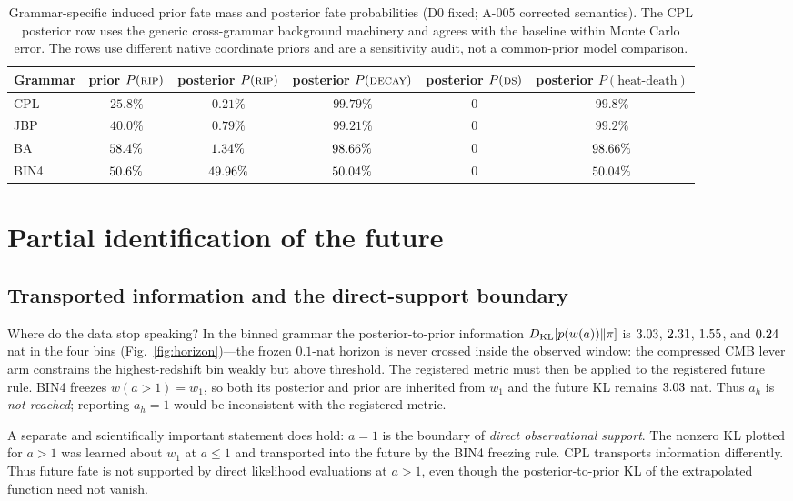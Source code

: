 \documentclass[a4paper,11pt]{article}
\begin{document}
\begin{table}[t]
\caption{Grammar-specific induced prior fate mass and posterior fate
probabilities (D0 fixed; A-005 corrected semantics). The CPL posterior row uses the
generic cross-grammar background machinery and agrees with the baseline
within Monte Carlo error. The rows use different native coordinate priors and
are a sensitivity audit, not a common-prior model comparison.}\label{tab:grammar}
\scriptsize
\begin{tabular}{lccccc}
Grammar & prior $P(\textsc{rip})$ & posterior $P(\textsc{rip})$ &
posterior $P(\textsc{decay})$ & posterior $P(\textsc{ds})$ &
posterior $P(\text{heat-death})$ \\
\hline
CPL & $25.8\%$ & $0.21\%$ & $99.79\%$ & $0$ & $99.8\%$ \\
JBP & $40.0\%$ & $0.79\%$ & $99.21\%$ & $0$ & $99.2\%$ \\
BA & $58.4\%$ & $1.34\%$ & $98.66\%$ & $0$ & $98.66\%$ \\
BIN4 & $50.6\%$ & $49.96\%$ & $50.04\%$ & $0$ & $50.04\%$ \\
\end{tabular}
\end{table}

\section{Partial identification of the future}\label{sec:partialid}
\subsection{Transported information and the direct-support boundary}\label{sec:ah}

Where do the data stop speaking? In the binned grammar the posterior-to-prior
information $D_{\rm KL}[p(w(a))\|\pi]$ is $3.03$, $2.31$, $1.55$, and $0.24$
nat in the four bins (Fig.~\ref{fig:horizon})---the frozen $0.1$-nat horizon
is never crossed inside the observed window: the compressed CMB lever arm
constrains the highest-redshift bin weakly but above threshold. The registered
metric must then be applied to the registered future rule. BIN4 freezes
$w(a>1)=w_1$, so both its posterior and prior are inherited from $w_1$ and
the future KL remains $3.03$ nat. Thus $a_h$ is \emph{not reached};
reporting $a_h=1$ would be inconsistent with the registered metric.

A separate and scientifically important statement does hold: $a=1$ is the
boundary of \emph{direct observational support}. The nonzero KL plotted for
$a>1$ was learned about $w_1$ at $a\le1$ and transported into the future by
the BIN4 freezing rule. CPL transports information differently. Thus future
fate is not supported by direct likelihood evaluations at $a>1$, even though
the posterior-to-prior KL of the extrapolated function need not vanish.
\end{document}

